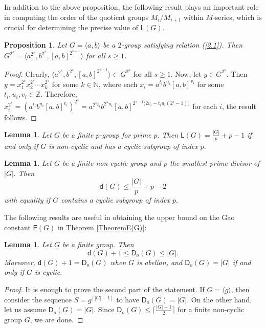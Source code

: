 \documentclass[a4paper,11pt]{article}
\numberwithin{equation}{section}
\newtheorem{prop}{Proposition}[section]
\newtheorem{lem}[thm]{Lemma}
\newcommand{\no}{\noindent}
\begin{document}
\noindent In addition to the above proposition, the following result plays an important role in computing the order of the quotient groups $M_i/M_{i+1}$ within $M$-series, which is crucial for determining the precise value of $\mathsf{L}(G)$.

\begin{prop}{\label{power}}
Let $G=\langle a,b \rangle$ be a $2$-group satisfying relation \emph{(\ref{2.1})}. Then $G^{2^s}=\langle a^{2^s}, b^{2^s}, [a,b]^{2^{s-1}} \rangle$ for all $s\geq 1$.
\end{prop}
\begin{proof} Clearly, $\langle a^{2^s}, b^{2^s}, [a,b]^{2^{s-1}} \rangle \subset G^{2^s} $ for all $s\geq 1$.
Now, let $y \in G^{2^s}$. Then $y=x^{2^s}_1x^{2^s}_2 \cdots x^{2^s}_k$ for some $k\in \mathbb{N}$, where each $x_{i}=a^{t_i} b^{u_i} [a,b]^{v_i}$ for some $t_i, u_i, v_i \in \mathbb{Z}$. Therefore, $x^{2^s}_{i}=(a^{t_i} b^{u_i} [a,b]^{v_i})^{2^s}=a^{2^s t_i}b^{2^s u_i}[a,b]^{2^{s-1}({2v_i}-{t_{i}u_{i}(2^{s}-1))}}$ for each $i$, the result follows.
\end{proof}


\begin{lem}\emph{\cite[Theorem 1.6]{Koshitani1977}}\label{EqL}
    Let $G$ be a finite $p$-group for prime $p.$ Then $\mathsf{L}(G) = \frac{|G|}{p}+p-1$ if and only if $G$ is non-cyclic and has a cyclic subgroup of index $p.$
\end{lem}

\begin{lem}\emph{\cite[Theorem 1.1]{QuLiTeeuwsen2022}}\label{dd}
    Let $G$ be a finite non-cyclic group and $p$ the smallest prime divisor of $|G|.$
Then $$\mathsf{d}(G) \le  \frac{|G|}{p}+p-2 $$with equality if $G$ contains a cyclic subgroup of index $p.$
\end{lem}
\no The following results are useful in obtaining the upper bound on the Gao constant $\mathsf{E}(G)$ in Theorem \ref{TheoremE(G)}:



\begin{lem}\label{d(G)D_o(G)}
    Let $G$ be a finite group. Then 
    $$\mathsf{d}(G)+1 \le \mathsf{D}_o(G) \le |G|.$$
    Moreover, $\mathsf{d}(G)+1 = \mathsf{D}_o(G)$ when $G$ is abelian, and $\mathsf{D}_o(G)=|G|$ if and only if $G$ is cyclic.
    \end{lem} 
\begin{proof} 

It is enough to prove the second part of the statement. If $G=\langle g \rangle$, then consider the sequence $S=g^{[|G|-1]}$ to have $ \mathsf{D}_o(G) = |G|.$ On the other hand, let us assume $\mathsf{D}_o(G)=|G|$. Since $\mathsf{D}_{o}(G) \le \bigg\lceil \frac{|G|+1}{2} \bigg\rceil$ for a finite non-cyclic group $G$, we are done.
\end{proof}
\end{document}
